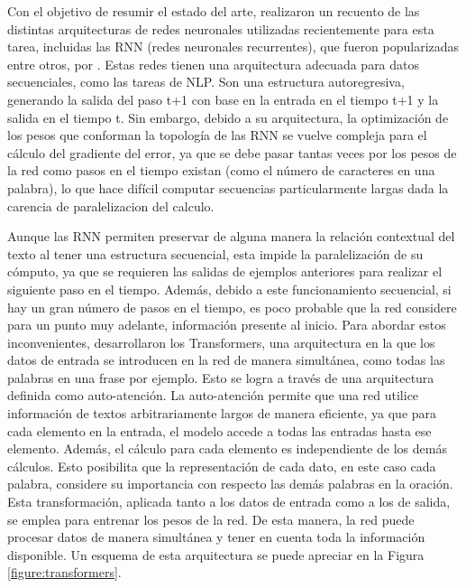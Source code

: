 Con el objetivo de resumir el estado del arte, \cite{acheampong2021transformer} realizaron un recuento de las distintas arquitecturas de redes neuronales utilizadas recientemente para esta tarea, incluidas las RNN (redes neuronales recurrentes), que fueron popularizadas entre otros, por \cite{cho2014learning}. Estas redes tienen una arquitectura adecuada para datos secuenciales, como las tareas de NLP. Son una estructura autoregresiva, generando la salida del paso t+1 con base en la entrada en el tiempo t+1 y la salida en el tiempo t. Sin embargo, debido a su arquitectura, la optimización de los pesos que conforman la topología de las RNN se vuelve compleja para el cálculo del gradiente del error, ya que se debe pasar tantas veces por los pesos de la red como pasos en el tiempo existan (como el número de caracteres en una palabra), lo que hace difícil computar secuencias particularmente largas dada la carencia de paralelizacion del calculo.

Aunque las RNN permiten preservar de alguna manera la relación contextual del texto al tener una estructura secuencial, esta impide la paralelización de su cómputo, ya que se requieren las salidas de ejemplos anteriores para realizar el siguiente paso en el tiempo. Además, debido a este funcionamiento secuencial, si hay un gran número de pasos en el tiempo, es poco probable que la red considere para un punto muy adelante, información presente al inicio. Para abordar estos inconvenientes, \cite{vaswani2017attention} desarrollaron los Transformers, una arquitectura en la que los datos de entrada se introducen en la red de manera simultánea, como todas las palabras en una frase por ejemplo. Esto se logra a través de una arquitectura definida como auto-atención. La auto-atención permite que una red utilice información de textos arbitrariamente largos de manera eficiente, ya que para cada elemento en la entrada, el modelo accede a todas las entradas hasta ese elemento. Además, el cálculo para cada elemento es independiente de los demás cálculos. Esto posibilita que la representación de cada dato, en este caso cada palabra, considere su importancia con respecto las demás palabras en la oración. Esta transformación, aplicada tanto a los datos de entrada como a los de salida, se emplea para entrenar los pesos de la red. De esta manera, la red puede procesar datos de manera simultánea y tener en cuenta toda la información disponible. Un esquema de esta arquitectura se puede apreciar en la Figura \ref{figure:transformers}.

